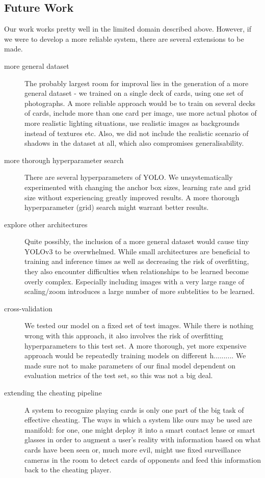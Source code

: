 \documentclass[a4paper]{article}
\begin{document}
\subsection{Future Work}
Our work works pretty well in the limited domain described above. However, if we were to develop a more reliable system, there are several extensions to be made.
\begin{description}
\item[more general dataset] The probably largest room for improval lies in the generation of a more general dataset - we trained on a single deck of cards, using one set of photographs. A more reliable approach would be to train on several decks of cards, include more than one card per image, use more actual photos of more realistic lighting situations, use realistic images as backgrounds instead of textures etc.
Also, we did not include the realistic scenario of shadows in the dataset at all, which also compromises generalisability.
\item[more thorough hyperparameter search] There are several hyperparameters of YOLO. We unsystematically experimented with changing the anchor box sizes, learning rate and grid size without experiencing greatly improved results. A more thorough hyperparameter (grid) search might warrant better results.

\item[explore other architectures] Quite possibly, the inclusion of a more general dataset would cause tiny YOLOv3 to be overwhelmed. While small architectures are beneficial to training and inference times as well as decreasing the risk of overfitting, they also encounter difficulties when relationships to be learned become overly complex. Especially including images with a very large range of scaling/zoom introduces a large number of more subtelities to be learned.
\item[cross-validation] We tested our model on a fixed set of test images. While there is nothing wrong with this approach, it also involves the risk of overfitting hyperparameters to this test set. A more thorough, yet more expensive approach would be repeatedly training models on different h.......... We made sure not to make parameters of our final model dependent on evaluation metrics of the test set, so this was not a big deal.
\item[extending the cheating pipeline] A system to recognize playing cards is only one part of the big task of effective cheating. The ways in which a system like ours may be used are manifold: for one, one might deploy it into a smart contact lense or smart glasses in order to augment a user's reality with information based on what cards have been seen or, much more evil, might use fixed surveillance cameras in the room to detect cards of opponents and feed this information back to the cheating player. 
\end{description}
\end{document}
